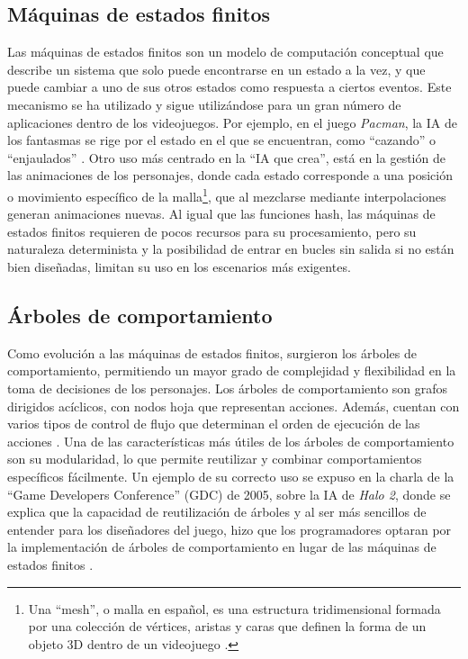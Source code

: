 \subsection{Máquinas de estados finitos}

Las máquinas de estados finitos son un modelo de computación conceptual que describe un sistema que solo puede encontrarse en un estado a la vez, y que puede cambiar a uno de sus otros estados como respuesta a ciertos eventos. Este mecanismo se ha utilizado y sigue utilizándose para un gran número de aplicaciones dentro de los videojuegos. Por ejemplo, en el juego \textit{Pac\-man}, la IA de los fantasmas se rige por el estado en el que se encuentran, como ``cazando'' o ``enjaulados'' \cite{mike_game_2016}. Otro uso más centrado en la ``IA que crea'', está en la gestión de las animaciones de los personajes, donde cada estado corresponde a una posición o movimiento específico de la malla\footnote{Una ``mesh'', o malla en español, es una estructura tridimensional formada por una colección de vértices, aristas y caras que definen la forma de un objeto 3D dentro de un videojuego \cite{universidad_europea_que_2025}.}, que al mezclarse mediante interpolaciones generan animaciones nuevas. Al igual que las funciones hash, las máquinas de estados finitos requieren de pocos recursos para su procesamiento, pero su naturaleza determinista y la posibilidad de entrar en bucles sin salida si no están bien diseñadas, limitan su uso en los escenarios más exigentes.

\subsection{Árboles de comportamiento}

Como evolución a las máquinas de estados finitos, surgieron los árboles de comportamiento, permitiendo un mayor grado de complejidad y flexibilidad en la toma de decisiones de los personajes. Los árboles de comportamiento son grafos dirigidos acíclicos, con nodos hoja que representan acciones. Además, cuentan con varios tipos de control de flujo que determinan el orden de ejecución de las acciones \cite{epic_games_behavior_2024}. Una de las características más útiles de los árboles de comportamiento son su modularidad, lo que permite reutilizar y combinar comportamientos específicos fácilmente. Un ejemplo de su correcto uso se expuso en la charla de la ``Game Developers Conference'' (GDC) de 2005, sobre la IA de \textit{Halo 2}, donde se explica que la capacidad de reutilización de árboles y al ser más sencillos de entender para los diseñadores del juego, hizo que los programadores optaran por la implementación de árboles de comportamiento en lugar de las máquinas de estados finitos \cite{isla_managing_2005}.


